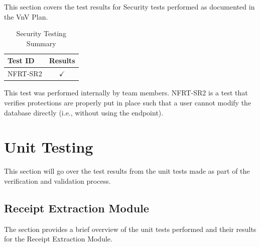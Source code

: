 \documentclass[12pt, titlepage]{article}
\begin{document}
This section covers the test results for Security tests performed as documented in the VnV Plan.

\begin{longtable}{|l|c|}
  \caption{Security Testing Summary} \label{Security Testing Summary} \\
  \toprule
  \textbf{Test ID} & \textbf{Results} \\
  \midrule
  NFRT-SR2 & $\checkmark$ \\
  \bottomrule
\end{longtable}

This test was performed internally by team members. NFRT-SR2 is a test that verifies protections are properly put in
place such that a user cannot modify the database directly (i.e., without using the endpoint).
	


\section{Unit Testing}

This section will go over the test results from the unit tests made as part of the
verification and validation process.

\subsection{Receipt Extraction Module}

The section provides a brief overview of the unit tests performed and their results for the
Receipt Extraction Module.
\end{document}
